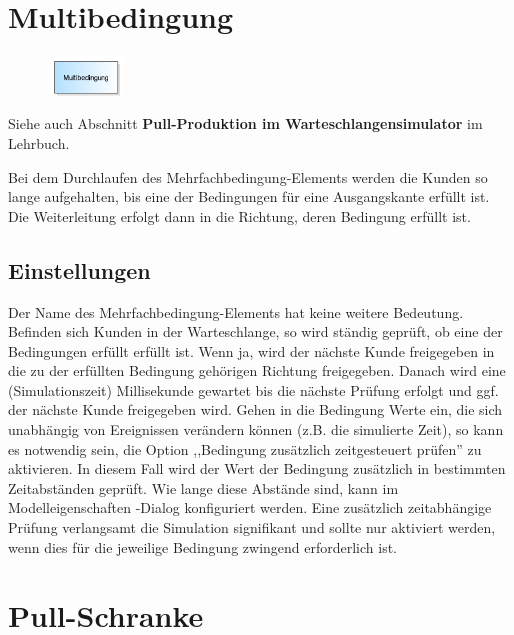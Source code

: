 \section{Multibedingung}
\label{ref:ModelElementHoldMulti}

\begin{figure}
\vspace{-22pt}
\includegraphics[width=2cm]{imageModelElementHoldMulti.png}
\vspace{-22pt}
\end{figure}

Siehe auch Abschnitt \textbf{Pull-Produktion im Warteschlangensimulator} im Lehrbuch.

Bei dem Durchlaufen des Mehrfachbedingung-Elements werden die Kunden so lange aufgehalten, bis eine der Bedingungen für eine
Ausgangskante erfüllt ist. Die Weiterleitung erfolgt dann in die Richtung, deren Bedingung erfüllt ist.

\subsection*{Einstellungen}

Der Name des Mehrfachbedingung-Elements hat keine weitere Bedeutung. Befinden sich Kunden in der Warteschlange, so wird ständig geprüft,
ob eine der Bedingungen erfüllt erfüllt ist. Wenn ja, wird der nächste Kunde freigegeben in die zu der erfüllten Bedingung
gehörigen Richtung freigegeben. Danach wird eine (Simulationszeit) Millisekunde gewartet bis die nächste
Prüfung erfolgt und ggf. der nächste Kunde freigegeben wird.
Gehen in die Bedingung Werte ein, die sich unabhängig von Ereignissen verändern können (z.B. die simulierte Zeit), so kann es notwendig sein,
die Option ,,Bedingung zusätzlich zeitgesteuert prüfen'' zu aktivieren. In diesem Fall wird der Wert der Bedingung zusätzlich in bestimmten
Zeitabständen geprüft. Wie lange diese Abstände sind, kann im Modelleigenschaften -Dialog konfiguriert
werden. Eine zusätzlich zeitabhängige Prüfung verlangsamt die Simulation signifikant und sollte nur aktiviert werden, wenn dies für die
jeweilige Bedingung zwingend erforderlich ist.


\section{Pull-Schranke}
\label{ref:ModelElementBarrierPull}

